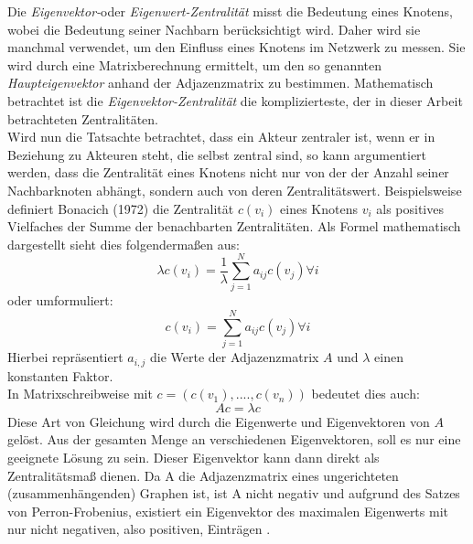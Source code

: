 Die \textit{Eigenvektor-}oder \textit{Eigenwert-Zentralität} misst die Bedeutung eines Knotens, wobei die Bedeutung seiner Nachbarn berücksichtigt wird. Daher wird sie manchmal verwendet, um den Einfluss eines Knotens im Netzwerk zu messen. Sie wird durch eine Matrixberechnung ermittelt, um den so genannten \textit{Haupteigenvektor} anhand der Adjazenzmatrix zu bestimmen. Mathematisch betrachtet ist die \textit{Eigenvektor-Zentralität} die komplizierteste, der in dieser Arbeit betrachteten Zentralitäten.\\
Wird nun die Tatsachte betrachtet, dass ein Akteur zentraler ist, wenn er in Beziehung zu Akteuren steht, die selbst zentral sind, so kann argumentiert werden, dass die Zentralität eines Knotens nicht nur von der der Anzahl seiner Nachbarknoten abhängt, sondern auch von deren Zentralitätswert. Beispielsweise definiert Bonacich (1972) die Zentralität $c(v_i)$ eines Knotens $v_i$ als positives Vielfaches der Summe der benachbarten Zentralitäten. Als Formel mathematisch dargestellt sieht dies folgendermaßen aus:
\begin{equation}
     \lambda c(v_i) = \frac{1}{\lambda} \sum_{j=1}^{N}a_{ij}c(v_j) \forall i
\end{equation} oder umformuliert:  
\begin{equation}
     c(v_i) = \sum_{j=1}^{N}a_{ij}c(v_j) \forall i
\end{equation}
Hierbei repräsentiert $a_{i,j}$ die Werte der Adjazenzmatrix $A$ und $\lambda$ einen konstanten Faktor. \\
In Matrixschreibweise mit $c = (c(v_1), ...., c(v_n))$ bedeutet dies auch:
\begin{equation}
     Ac = \lambda c
\end{equation}
Diese Art von Gleichung wird durch die Eigenwerte und Eigenvektoren von $A$ gelöst.
Aus der gesamten Menge an verschiedenen Eigenvektoren, soll es nur eine geeignete Lösung zu sein. 
Dieser Eigenvektor kann dann direkt als Zentralitätsmaß dienen. Da A die Adjazenzmatrix eines ungerichteten (zusammenhängenden) Graphen ist, ist A nicht negativ und aufgrund des Satzes von Perron-Frobenius, existiert ein Eigenvektor des maximalen Eigenwerts mit nur nicht negativen, also positiven, Einträgen \cite{brittaRuhnau}.

